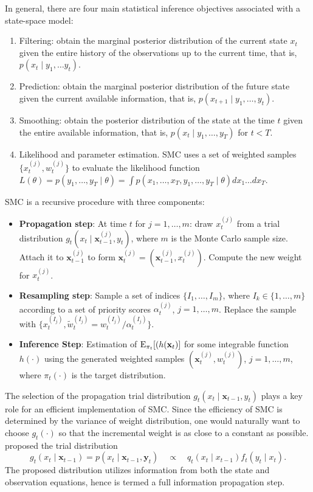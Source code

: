 In general, there are four main statistical inference objectives associated with a state-space model:
\begin{enumerate}
\item Filtering: obtain the marginal posterior distribution of the current state $x_t$ given the entire history of the observations up to the current time, that is, $p(x_t \mid y_1, \ldots y_t)$.
\item Prediction: obtain the marginal posterior distribution of the future state given the
current available information,  that is,  $p(x_{t+1}\mid y_1,\ldots, y_t)$.
\item Smoothing: obtain the posterior distribution of the state at the time $t$ given the entire available information, that is, $p(x_{t} \mid y_1,\ldots, y_T)$ for $t<T$.
\item Likelihood and parameter estimation. SMC uses a set of weighted samples $\{x_t^{(j)},w_t^{(j)}\}$ to evaluate the likelihood function $L(\theta)=p(y_1,\ldots,y_T\mid \theta)
=\int p(x_1,\ldots,x_T, y_1,\ldots,y_T\mid \theta)dx_1\ldots dx_T$.
\end{enumerate}


SMC is a recursive procedure with three components:
\begin{itemize}
\item {\bf Propagation step}: At time $t$ for $j=1,\ldots, m$: draw $x_t^{(j)}$ from a trial distribution $g_t(x_t \mid {\mathbf x}_{t-1}^{(j)},y_t)$, where $m$ is the Monte Carlo sample size. Attach it to ${\mathbf x}_{t-1}^{(j)}$ to form ${\mathbf x}_{t}^{(j)}=({\mathbf x}_{t-1}^{(j)}, x_t^{(j)})$. Compute the new weight for $x_{t}^{(j)}$.
\item {\bf Resampling step}: Sample a set of indices $\{I_1, \ldots, I_m\}$, where $I_k\in \{1, \ldots, m \}$ according to a set of priority scores $\alpha_t^{(j)}$, $j=1,\ldots, m$. Replace the sample with $\{x_t^{(I_j)}, \tilde{w}_t^{(I_j)}=w^{(I_j)}_t/\alpha^{(I_j)}_t\}$.
\item {\bf Inference Step}: Estimation of ${\rm E}_{\pi_t}[(h({\mathbf x}_t)]$ for some integrable function $h(\cdot)$ using the generated weighted samples $({\mathbf x}_t^{(j)}, w_t^{(j)})$, $j=1,\ldots,m$, where $\pi_t(\cdot)$ is the target distribution. 
\end{itemize}
The selection of the propagation trial distribution $g_t(x_t\mid {\mathbf x}_{t-1},y_t)$ plays a key role
for an efficient implementation of SMC. Since the efficiency of SMC is determined by the variance of weight distribution, one would naturally want to choose $g_t(\cdot)$ so that the incremental weight is as close to a constant as possible. \citet{LiuChen1995, LiuChen1998} proposed the trial distribution
\[
g_t(x_t\mid {\mathbf x}_{t-1})=p(x_t\mid {\mathbf x}_{t-1},{\mathbf y}_t)\quad  \propto\quad  q_t(x_t\mid x_{t-1})f_t(y_t\mid x_t).
\]
The proposed distribution utilizes information from both the state and observation equations, hence is termed a full information propagation step.


